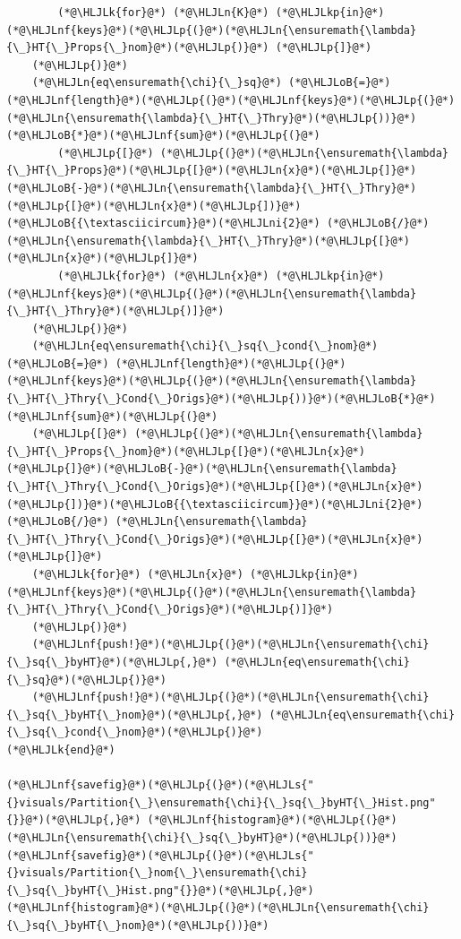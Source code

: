 \documentclass[12pt,a4paper]{article}
\newcommand{\HLJLk}[1]{\textcolor[RGB]{148,91,176}{\textbf{#1}}}
\newcommand{\HLJLkp}[1]{\textcolor[RGB]{148,91,176}{\textbf{#1}}}
\newcommand{\HLJLn}[1]{#1}
\newcommand{\HLJLnf}[1]{\textcolor[RGB]{66,102,213}{#1}}
\newcommand{\HLJLs}[1]{\textcolor[RGB]{201,61,57}{#1}}
\newcommand{\HLJLni}[1]{\textcolor[RGB]{59,151,46}{#1}}
\newcommand{\HLJLoB}[1]{\textcolor[RGB]{102,102,102}{\textbf{#1}}}
\newcommand{\HLJLp}[1]{#1}
\begin{document}
\begin{lstlisting}
		(*@\HLJLk{for}@*) (*@\HLJLn{K}@*) (*@\HLJLkp{in}@*) (*@\HLJLnf{keys}@*)(*@\HLJLp{(}@*)(*@\HLJLn{\ensuremath{\lambda}{\_}HT{\_}Props{\_}nom}@*)(*@\HLJLp{)}@*) (*@\HLJLp{]}@*)
	(*@\HLJLp{)}@*)
	(*@\HLJLn{eq\ensuremath{\chi}{\_}sq}@*) (*@\HLJLoB{=}@*) (*@\HLJLnf{length}@*)(*@\HLJLp{(}@*)(*@\HLJLnf{keys}@*)(*@\HLJLp{(}@*)(*@\HLJLn{\ensuremath{\lambda}{\_}HT{\_}Thry}@*)(*@\HLJLp{))}@*)(*@\HLJLoB{*}@*)(*@\HLJLnf{sum}@*)(*@\HLJLp{(}@*)
		(*@\HLJLp{[}@*) (*@\HLJLp{(}@*)(*@\HLJLn{\ensuremath{\lambda}{\_}HT{\_}Props}@*)(*@\HLJLp{[}@*)(*@\HLJLn{x}@*)(*@\HLJLp{]}@*)(*@\HLJLoB{-}@*)(*@\HLJLn{\ensuremath{\lambda}{\_}HT{\_}Thry}@*)(*@\HLJLp{[}@*)(*@\HLJLn{x}@*)(*@\HLJLp{])}@*)(*@\HLJLoB{{\textasciicircum}}@*)(*@\HLJLni{2}@*) (*@\HLJLoB{/}@*) (*@\HLJLn{\ensuremath{\lambda}{\_}HT{\_}Thry}@*)(*@\HLJLp{[}@*)(*@\HLJLn{x}@*)(*@\HLJLp{]}@*)
		(*@\HLJLk{for}@*) (*@\HLJLn{x}@*) (*@\HLJLkp{in}@*) (*@\HLJLnf{keys}@*)(*@\HLJLp{(}@*)(*@\HLJLn{\ensuremath{\lambda}{\_}HT{\_}Thry}@*)(*@\HLJLp{)]}@*)
	(*@\HLJLp{)}@*)
	(*@\HLJLn{eq\ensuremath{\chi}{\_}sq{\_}cond{\_}nom}@*) (*@\HLJLoB{=}@*) (*@\HLJLnf{length}@*)(*@\HLJLp{(}@*)(*@\HLJLnf{keys}@*)(*@\HLJLp{(}@*)(*@\HLJLn{\ensuremath{\lambda}{\_}HT{\_}Thry{\_}Cond{\_}Origs}@*)(*@\HLJLp{))}@*)(*@\HLJLoB{*}@*)(*@\HLJLnf{sum}@*)(*@\HLJLp{(}@*)
	(*@\HLJLp{[}@*) (*@\HLJLp{(}@*)(*@\HLJLn{\ensuremath{\lambda}{\_}HT{\_}Props{\_}nom}@*)(*@\HLJLp{[}@*)(*@\HLJLn{x}@*)(*@\HLJLp{]}@*)(*@\HLJLoB{-}@*)(*@\HLJLn{\ensuremath{\lambda}{\_}HT{\_}Thry{\_}Cond{\_}Origs}@*)(*@\HLJLp{[}@*)(*@\HLJLn{x}@*)(*@\HLJLp{])}@*)(*@\HLJLoB{{\textasciicircum}}@*)(*@\HLJLni{2}@*) (*@\HLJLoB{/}@*) (*@\HLJLn{\ensuremath{\lambda}{\_}HT{\_}Thry{\_}Cond{\_}Origs}@*)(*@\HLJLp{[}@*)(*@\HLJLn{x}@*)(*@\HLJLp{]}@*)
	(*@\HLJLk{for}@*) (*@\HLJLn{x}@*) (*@\HLJLkp{in}@*) (*@\HLJLnf{keys}@*)(*@\HLJLp{(}@*)(*@\HLJLn{\ensuremath{\lambda}{\_}HT{\_}Thry{\_}Cond{\_}Origs}@*)(*@\HLJLp{)]}@*)
	(*@\HLJLp{)}@*)
	(*@\HLJLnf{push!}@*)(*@\HLJLp{(}@*)(*@\HLJLn{\ensuremath{\chi}{\_}sq{\_}byHT}@*)(*@\HLJLp{,}@*) (*@\HLJLn{eq\ensuremath{\chi}{\_}sq}@*)(*@\HLJLp{)}@*)
	(*@\HLJLnf{push!}@*)(*@\HLJLp{(}@*)(*@\HLJLn{\ensuremath{\chi}{\_}sq{\_}byHT{\_}nom}@*)(*@\HLJLp{,}@*) (*@\HLJLn{eq\ensuremath{\chi}{\_}sq{\_}cond{\_}nom}@*)(*@\HLJLp{)}@*)
(*@\HLJLk{end}@*)

(*@\HLJLnf{savefig}@*)(*@\HLJLp{(}@*)(*@\HLJLs{"{}visuals/Partition{\_}\ensuremath{\chi}{\_}sq{\_}byHT{\_}Hist.png"{}}@*)(*@\HLJLp{,}@*) (*@\HLJLnf{histogram}@*)(*@\HLJLp{(}@*)(*@\HLJLn{\ensuremath{\chi}{\_}sq{\_}byHT}@*)(*@\HLJLp{))}@*)
(*@\HLJLnf{savefig}@*)(*@\HLJLp{(}@*)(*@\HLJLs{"{}visuals/Partition{\_}nom{\_}\ensuremath{\chi}{\_}sq{\_}byHT{\_}Hist.png"{}}@*)(*@\HLJLp{,}@*) (*@\HLJLnf{histogram}@*)(*@\HLJLp{(}@*)(*@\HLJLn{\ensuremath{\chi}{\_}sq{\_}byHT{\_}nom}@*)(*@\HLJLp{))}@*)
\end{lstlisting}
\end{document}
